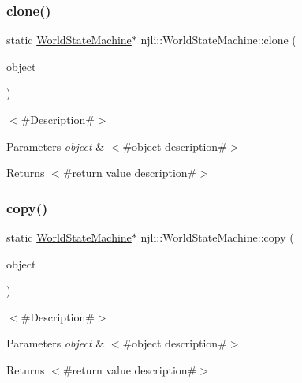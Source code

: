\subsubsection{\texorpdfstring{clone()}{clone()}}
{\footnotesize\ttfamily static \mbox{\hyperlink{classnjli_1_1_world_state_machine}{World\+State\+Machine}}$\ast$ njli\+::\+World\+State\+Machine\+::clone (\begin{DoxyParamCaption}\item[{const \mbox{\hyperlink{classnjli_1_1_world_state_machine}{World\+State\+Machine}} \&}]{object }\end{DoxyParamCaption})\hspace{0.3cm}{\ttfamily [static]}}

$<$\#\+Description\#$>$


\begin{DoxyParams}{Parameters}
{\em object} & $<$\#object description\#$>$\\
\hline
\end{DoxyParams}
\begin{DoxyReturn}{Returns}
$<$\#return value description\#$>$ 
\end{DoxyReturn}
\mbox{\label{classnjli_1_1_world_state_machine_a5681a372a589ecaa3fb096b9fdcafc2e}} 
\subsubsection{\texorpdfstring{copy()}{copy()}}
{\footnotesize\ttfamily static \mbox{\hyperlink{classnjli_1_1_world_state_machine}{World\+State\+Machine}}$\ast$ njli\+::\+World\+State\+Machine\+::copy (\begin{DoxyParamCaption}\item[{const \mbox{\hyperlink{classnjli_1_1_world_state_machine}{World\+State\+Machine}} \&}]{object }\end{DoxyParamCaption})\hspace{0.3cm}{\ttfamily [static]}}

$<$\#\+Description\#$>$


\begin{DoxyParams}{Parameters}
{\em object} & $<$\#object description\#$>$\\
\hline
\end{DoxyParams}
\begin{DoxyReturn}{Returns}
$<$\#return value description\#$>$ 
\end{DoxyReturn}
\mbox{\label{classnjli_1_1_world_state_machine_a2ea736b13cbb1aa35788809869a480d9}} 
